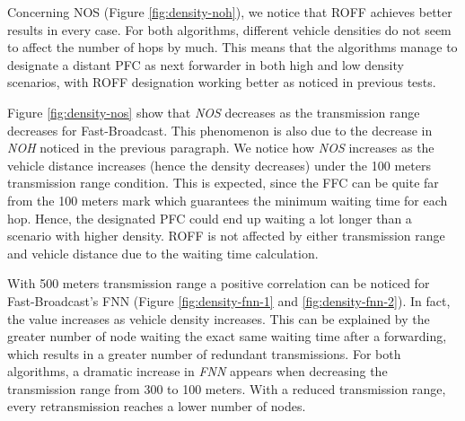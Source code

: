 		
		Concerning NOS (Figure \ref{fig:density-noh}), we notice that ROFF achieves better results in every case. For both algorithms, different vehicle densities do not seem to affect the number of hops by much. This means that the algorithms manage to designate a distant PFC as next forwarder in both high and low density scenarios, with ROFF designation working better as noticed in previous tests.
		
		
		Figure \ref{fig:density-nos} show that \textit{NOS} decreases as the transmission range decreases for Fast-Broadcast. This phenomenon is also due to the decrease in \textit{NOH} noticed in the previous paragraph. We notice how \textit{NOS} increases as the vehicle distance increases (hence the density decreases) under the 100 meters transmission range condition. This is expected, since the FFC can be quite far from the 100 meters mark which guarantees the minimum waiting time for each hop. Hence, the designated PFC could end up waiting a lot longer than a scenario with higher density.
		ROFF is not affected by either transmission range and vehicle distance due to the waiting time calculation.
		
		
		With 500 meters transmission range a positive correlation can be noticed for Fast-Broadcast's FNN (Figure \ref{fig:density-fnn-1} and \ref{fig:density-fnn-2}). In fact, the value increases as vehicle density increases. This can be explained by the greater number of node waiting the exact same waiting time after a forwarding, which results in a greater number of redundant transmissions. 
		For both algorithms, a dramatic increase in \textit{FNN} appears when decreasing the transmission range from 300 to 100 meters. With a reduced transmission range, every retransmission reaches a lower number of nodes.
		
	
